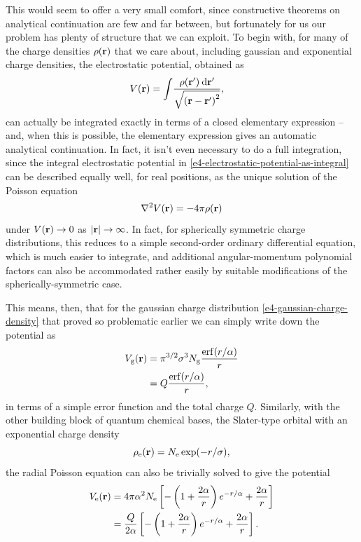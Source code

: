 This would seem to offer a very small comfort, since constructive theorems on analytical continuation are few and far between, but fortunately for us our problem has plenty of structure that we can exploit. To begin with, for many of the charge densities $\rho(\vb{r})$ that we care about, including gaussian and exponential charge densities, the electrostatic potential, obtained as
\begin{align}
V(\vb{r})
& =
\int\!
\frac{
  \rho(\vb{r}') \:\mathrm{d}\vb{r}'
  }{
  \sqrt{ \left( \vb{r}-\vb{r}' \right)^2}
  }
,
\label{e4-electrostatic-potential-as-integral}
\end{align}
can actually be integrated exactly in terms of a closed elementary expression -- and, when this is possible, the elementary expression gives an automatic analytical continuation. In fact, it isn't even necessary to do a full integration, since the integral electrostatic potential in \eqref{e4-electrostatic-potential-as-integral} can  be described equally well, for real positions, as the unique solution of the Poisson equation
\begin{equation}
\nabla^2 V(\vb{r})=-4\pi \rho(\vb{r})
\label{e4-poisson-equation}
\end{equation}
under $V(\vb{r})\to 0$ as $|\vb{r}|\to\infty$. In fact, for spherically symmetric charge distributions, this reduces to a simple second-order ordinary differential equation, which is much easier to integrate, and additional angular-momentum polynomial factors can also be accommodated rather easily by suitable modifications of the spherically-symmetric case.

This means, then, that for the gaussian charge distribution \eqref{e4-gaussian-charge-density} that proved so problematic earlier we can simply write down the potential as
\begin{subequations}
\label{e4-exact-gaussian-potential}
\begin{align}
\Vg(\vbr) 
& = 
\pi^{3/2} \sigma^3 \normg \frac{ \erf(r/\alpha) }{ r }
\\ & = 
Q \frac{ \erf(r/\alpha) }{ r }
,
\end{align}
\end{subequations}%
in terms of a simple error function  and the total charge $Q$. Similarly, with the other building block of quantum chemical bases, the Slater-type orbital with an exponential charge density
\begin{equation}
\rho_\mathrm{e}(\vb{r}) = N_\mathrm{e} \exp(-r/\sigma)
,
\label{e4-exponential-charge-density}
\end{equation}
the radial Poisson equation can also be trivially solved to give the potential
\begin{subequations}
\label{e4-exact-exponential-potential}%
\begin{align}
V_\mathrm{e}(\vb{r}) 
& = 
4\pi \alpha^2 N_\mathrm{e} \left[ - \left( 1 + \frac{2\alpha}{r} \right) e^{-r/\alpha} + \frac{2\alpha}{r} \right]
\\ & = 
 \frac{Q}{2\alpha} \left[ - \left( 1 + \frac{2\alpha}{r} \right) e^{-r/\alpha} + \frac{2\alpha}{r} \right]
.
\end{align}%
\end{subequations} %


